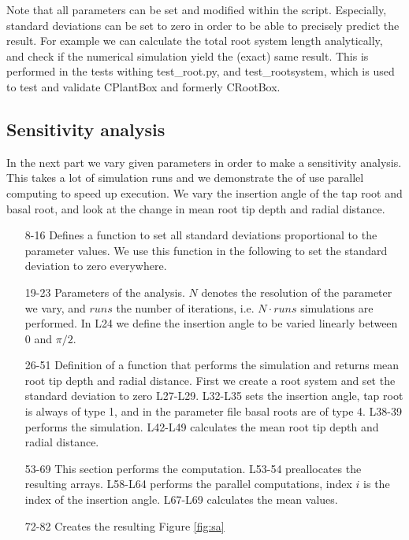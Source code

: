 \documentclass[a4paper]{article}
\begin{document}
Note that all parameters can be set and modified within the script. Especially, standard deviations can be set to zero in order to be able to precisely predict the result. For example we can calculate the total root system length analytically, and check if the numerical simulation yield the (exact) same result. This is performed in the tests withing test\_root.py, and test\_rootsystem, which is used to test and validate CPlantBox and formerly CRootBox.


\subsection{Sensitivity analysis} \label{sec:sa}

In the next part we vary given parameters in order to make a sensitivity analysis. This takes a lot of simulation runs and we demonstrate the of use parallel computing to speed up execution.
We vary the insertion angle of the tap root and basal root, and look at the change in mean root tip depth and radial distance. 



\begin{itemize}

\item[8-16] Defines a function to set all standard deviations proportional to the parameter values. We use this function in the following to set the standard deviation to zero everywhere. 

\item[19-23] Parameters of the analysis. $N$ denotes the resolution of the parameter we vary, and $runs$ the number of iterations, i.e. $N\cdot runs$ simulations are performed. 
In L24 we define the insertion angle to be varied linearly between 0 and $\pi/2$.

\item[26-51] Definition of a function that performs the simulation and returns mean root tip depth and radial distance. First we create a root system and set the standard deviation to zero L27-L29. 
L32-L35 sets the insertion angle, tap root is always of type 1, and in the parameter file basal roots are of type 4. L38-39 performs the simulation. 
L42-L49 calculates the mean root tip depth and radial distance. 

\item[53-69] This section performs the computation. L53-54 preallocates the resulting arrays. L58-L64 performs the parallel computations, index $i$ is the index of the insertion angle. L67-L69 calculates the mean values.

\item[72-82] Creates the resulting Figure \ref{fig:sa}

\end{itemize}
\end{document}
